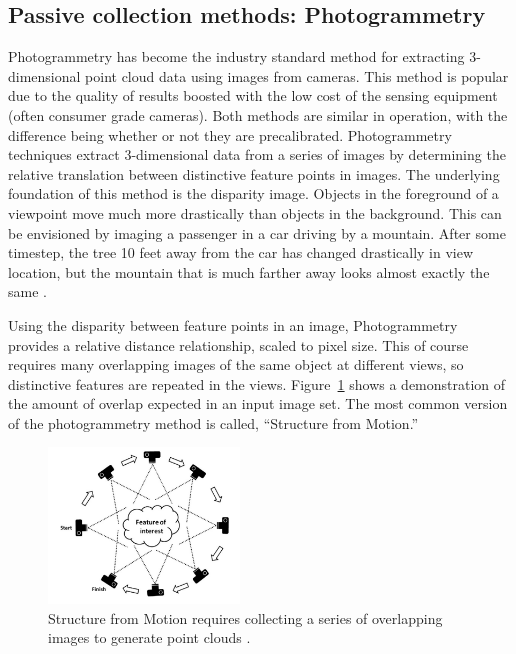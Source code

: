 \documentclass[12pt]{drexelthesis}
\let\Oldsubsection\subsection
\renewcommand{\subsection}{\FloatBarrier\Oldsubsection}
\begin{document}
\subsection{Passive collection methods: Photogrammetry}
\label{subsec:passive}
Photogrammetry has become the industry standard method for extracting 3-dimensional point cloud data using images from cameras. This method is popular due to the quality of results boosted with the low cost of the sensing equipment (often consumer grade cameras). Both methods are similar in operation, with the difference being whether or not they are precalibrated. Photogrammetry techniques extract 3-dimensional data from a series of images by determining the relative translation between distinctive feature points in images. The underlying foundation of this method is the disparity image. Objects in the foreground of a viewpoint move much more drastically than objects in the background. This can be envisioned by imaging a passenger in a car driving by a mountain. After some timestep, the tree 10 feet away from the car has changed drastically in view location, but the mountain that is much farther away looks almost exactly the same \cite{RN20}.

Using the disparity between feature points in an image, Photogrammetry provides a relative distance relationship, scaled to pixel size. This of course requires many overlapping images of the same object at different views, so distinctive features are repeated in the views. Figure~\ref{sfm:imageoverlap} shows a demonstration of the amount of overlap expected in an input image set. The most common version of the photogrammetry method is called, ``Structure from Motion.''

\begin{figure}[!ht]
	\centering
	\includegraphics[width=2in]{instruments/sfmimagecollection.png}
	\caption[Structure from Motion collection method]{\centering Structure from Motion requires collecting a series of overlapping images to generate point clouds \cite{WESTOBY2012300}.}
	\label{sfm:imageoverlap}
\end{figure}
\end{document}
